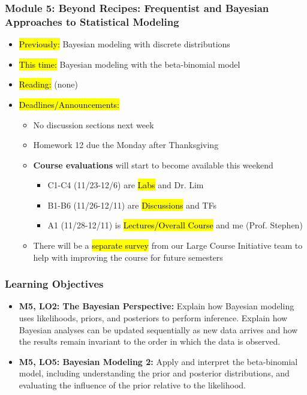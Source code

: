 
\begin{frame}
    \frametitle{Module 5: Beyond Recipes: Frequentist and Bayesian Approaches to Statistical Modeling}
    \begin{itemize}
        \item \hl{Previously: }Bayesian modeling with discrete distributions
        \item \hl{This time: }Bayesian modeling with the beta-binomial model
        \item \hl{Reading: }(none)
        \item \hl{Deadlines/Announcements: }
        \begin{itemize}
            \item No discussion sections next week
            \item Homework 12 due the Monday after Thanksgiving
            \item \textbf{Course evaluations} will start to become available this weekend
            \begin{itemize}
                \item C1-C4 (11/23-12/6) are \hl{Labs} and Dr. Lim
                \item B1-B6 (11/26-12/11) are \hl{Discussions} and TFs
                \item A1 (11/28-12/11) is \hl{Lectures/Overall Course} and me (Prof. Stephen)
            \end{itemize}
            \item There will be a \hl{separate survey} from our Large Course Initiative team to help with improving the course for future semesters
        \end{itemize}
    \end{itemize}

\end{frame}

\begin{frame}
    \frametitle{Learning Objectives}
    \begin{itemize}
        \item \textbf{M5, LO2: The Bayesian Perspective:} Explain how Bayesian modeling uses likelihoods, priors, and posteriors to perform inference. Explain how Bayesian analyses can be updated sequentially as new data arrives and how the results remain invariant to the order in which the data is observed.
        \item \textbf{M5, LO5: Bayesian Modeling 2:} Apply and interpret the beta-binomial model, including understanding the prior and posterior distributions, and evaluating the influence of the prior relative to the likelihood.
    \end{itemize}
\end{frame}
